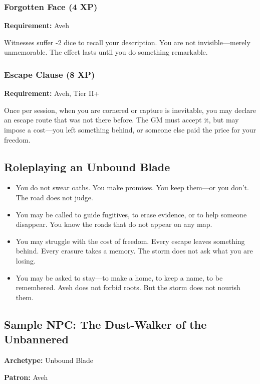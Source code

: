 \subsubsection{Forgotten Face (4 XP)}

\textbf{Requirement:} Aveh

Witnesses suffer -2 dice to recall your description. You are not invisible—merely unmemorable. The effect lasts until you do something remarkable.

\subsubsection{Escape Clause (8 XP)}

\textbf{Requirement:} Aveh, Tier II+

Once per session, when you are cornered or capture is inevitable, you may declare an escape route that was not there before. The GM must accept it, but may impose a cost—you left something behind, or someone else paid the price for your freedom.

\subsection{Roleplaying an Unbound Blade}

\begin{itemize}
\item You do not swear oaths. You make promises. You keep them—or you don't. The road does not judge.
\item You may be called to guide fugitives, to erase evidence, or to help someone disappear. You know the roads that do not appear on any map.
\item You may struggle with the cost of freedom. Every escape leaves something behind. Every erasure takes a memory. The storm does not ask what you are losing.
\item You may be asked to stay—to make a home, to keep a name, to be remembered. Aveh does not forbid roots. But the storm does not nourish them.
\end{itemize}

\subsection{Sample NPC: The Dust-Walker of the Unbannered}

\textbf{Archetype:} Unbound Blade

\textbf{Patron:} Aveh

